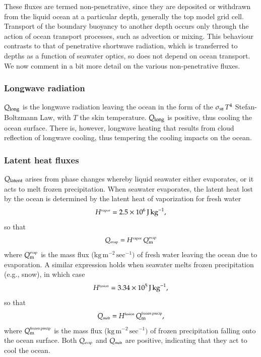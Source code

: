 These fluxes are termed non-penetrative, since they are deposited or
withdrawn from the liquid ocean at a particular depth, generally the
top model grid cell.  Transport of the boundary buoyancy to another
depth occurs only through the action of ocean transport processes,
such as advection or mixing.  This behaviour contrasts to that of
penetrative shortwave radiation, which is transferred to depths as a
function of seawater optics, so does not depend on ocean transport.
We now comment in a bit more detail on the various non-penetrative
fluxes.

\subsubsection{Longwave radiation}

$Q_{\mbox{\scriptsize long}}$ is the longwave radiation leaving the
ocean in the form of the $\sigma_{\mbox{\tiny SB}} \, T^{4}$
Stefan-Boltzmann Law, with $T$ the skin temperature.
$Q_{\mbox{\scriptsize long}}$ is positive, thus cooling the ocean
surface.  There is, however, longwave heating that results from
cloud reflection of longwave cooling, thus tempering the cooling
impacts on the ocean.  



\subsubsection{Latent heat fluxes}

$Q_{\mbox{\scriptsize latent}}$ arises from phase changes whereby
liquid seawater either evaporates, or it acts to melt frozen
precipitation.  When seawater evaporates, the latent heat lost by the
ocean is determined by the latent heat of vaporization for fresh water
  \begin{equation}
  H^{\mbox{\tiny vapor}} = 2.5 \times 10^{6} \, \mbox{J} \, \mbox{kg}^{-1},
\label{eq:latent-heat-vapor}
\end{equation}
so that 
\begin{equation}
  Q_{\mbox{\tiny evap}}  =  H^{\mbox{\tiny vapor}} \,  Q_{\mbox{\scriptsize m}}^{\mbox{\tiny evap}}
\end{equation}
where $Q_{\mbox{\scriptsize m}}^{\mbox{\tiny evap}}$ is the mass flux ($\mbox{kg} \,
\mbox{m}^{-2} \, \mbox{sec}^{-1})$ of fresh water leaving the ocean
due to evaporation. A similar expression holds when seawater melts
frozen precipitation (e.g., snow), in which case
\begin{equation}
  H^{\mbox{\tiny fusion}} = 3.34 \times 10^{5} \, \mbox{J} \, \mbox{kg}^{-1},
\label{eq:latent-heat-fusion}
\end{equation}
 so that 
\begin{equation}
  Q_{\mbox{\tiny melt}}  =  H^{\mbox{\tiny fusion}} \,  Q_{\mbox{\scriptsize m}}^{\mbox{\tiny frozen precip}},
\end{equation}
where $Q_{\mbox{\scriptsize m}}^{\mbox{\tiny frozen precip}}$ is the mass flux ($\mbox{kg}
\, \mbox{m}^{-2} \, \mbox{sec}^{-1})$ of frozen precipitation falling
onto the ocean surface. Both $Q_{\mbox{\tiny evap}}$ and
$Q_{\mbox{\tiny melt}}$ are positive, indicating that they act to cool
the ocean.

